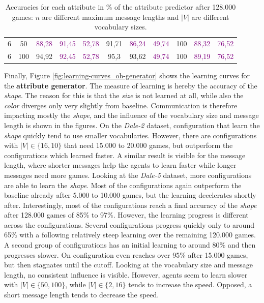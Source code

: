 \begin{table}[ht]
\begin{tabular}{cc|ccc|ccc|ccc}
        {6}                           & {50}    & \textcolor{purple}{88,28}           & \textcolor{purple}{91,45}           & \textcolor{purple}{52,78}                & {91,71}                         & \textcolor{purple}{86,24}       & \textcolor{purple}{49,74}      & {100}                           & \textcolor{purple}{88,32}       & \textcolor{purple}{76,52}      \\
        {6}                           & {100}   & {94,92}                             & \textcolor{purple}{92,45}           & \textcolor{purple}{52,78}                & {95,3}                          & {93,62}                         & \textcolor{purple}{49,74}      & {100}                           & \textcolor{purple}{89,19}       & \textcolor{purple}{76,52}      \\
        \bottomrule
    \end{tabular}
    \caption{Accuracies for each attribute in \% of the attribute predictor after 128.000 games: $n$ are different maximum message lengths and $|V|$ are different vocabulary sizes.}
    \label{tab:results:attribute-predictor-game}
\end{table}

Finally, Figure \ref{fig:learning-curves_oh-generator} shows the learning curves for the \textbf{attribute generator}.
The measure of learning is hereby the accuracy of the \emph{shape}.
The reason for this is that the \emph{size} is not learned at all, while also the \emph{color} diverges only very slightly from baseline.
Communication is therefore impacting mostly the \emph{shape}, and the influence of the vocabulary size and message length is shown in the figures.
On the \emph{Dale-2} dataset, configuration that learn the \emph{shape} quickly tend to use smaller vocabularies.
However, there are configurations with $|V| \in \{16,10\}$ that need 15.000 to 20.000 games, but outperform the configurations which learned faster.
A similar result is visible for the message length, where shorter messages help the agents to learn faster while longer messages need more games.
Looking at the \emph{Dale-5} dataset, more configurations are able to learn the \emph{shape}.
Most of the configurations again outperform the baseline already after 5.000 to 10.000 games, but the learning decelerates shortly after.
Interestingly, most of the configurations reach a final accuracy of the \emph{shape} after 128.000 games of 85\% to 97\%.
However, the learning progress is different across the configurations.
Several configurations progress quickly only to around 65\% with a following relatively steep learning over the remaining 120.000 games.
A second group of configurations has an initial learning to around 80\% and then progresses slower.
On configuration even reaches over 95\% after 15.000 games, but then stagnates until the cutoff.
Looking at the vocabulary size and message length, no consistent influence is visible.
However, agents seem to learn slower with $|V| \in \{50,100\}$, while $|V| \in \{2,16\}$ tends to increase the speed.
Opposed, a short message length tends to decrease the speed.

